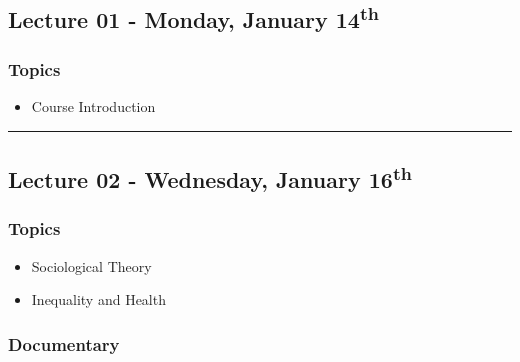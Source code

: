\documentclass[]{book}
\providecommand{\tightlist}{%
  \setlength{\itemsep}{0pt}\setlength{\parskip}{0pt}}
\begin{document}
\hypertarget{lecture-01---monday-january-14th}{%
\subsection*{\texorpdfstring{Lecture 01 - Monday, January 14\textsuperscript{th}}{Lecture 01 - Monday, January 14th}}\label{lecture-01---monday-january-14th}}

\hypertarget{topics}{%
\subsubsection*{Topics}\label{topics}}

\begin{itemize}
\tightlist
\item
  Course Introduction
\end{itemize}

\begin{center}\rule{0.5\linewidth}{\linethickness}\end{center}

\hypertarget{lecture-02---wednesday-january-16th}{%
\subsection*{\texorpdfstring{Lecture 02 - Wednesday, January 16\textsuperscript{th}}{Lecture 02 - Wednesday, January 16th}}\label{lecture-02---wednesday-january-16th}}

\hypertarget{topics-1}{%
\subsubsection*{Topics}\label{topics-1}}

\begin{itemize}
\tightlist
\item
  Sociological Theory
\item
  Inequality and Health
\end{itemize}

\hypertarget{documentary}{%
\subsubsection*{Documentary}\label{documentary}}
\end{document}
